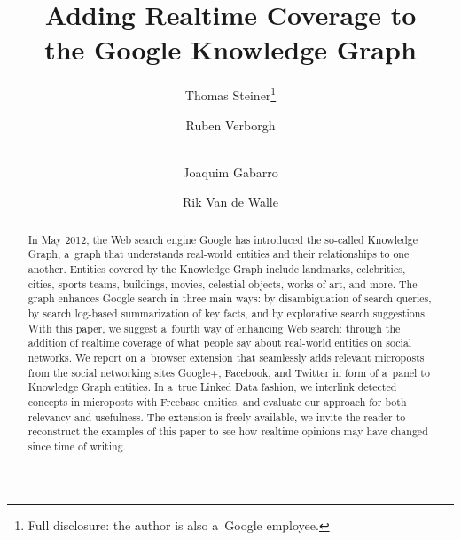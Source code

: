 \documentclass[runningheads,a4paper]{llncs}
\begin{document}
\title{Adding Realtime Coverage to\\the Google Knowledge Graph}

\author{Thomas Steiner\thanks{Full disclosure: the author is also a~Google employee.} \and
		Ruben Verborgh \and \\
		Joaquim Gabarro \and 
		Rik Van de Walle		
}


\maketitle
\setcounter{footnote}{0}

\begin{abstract}
In May 2012, the Web search engine Google has introduced the so-called Knowledge Graph,
a~graph that understands real-world entities and their relationships to one another.
Entities covered by the Knowledge Graph include landmarks, celebrities, cities, sports
teams, buildings, movies, celestial objects, works of art, and more.
The graph enhances Google search in three main ways:
by disambiguation of search queries,
by search log-based summarization of key facts,
and by explorative search suggestions.
With this paper, we suggest a~fourth way of enhancing Web search:
through the addition of realtime coverage
of what people say about real-world entities on social networks.
We report on a~browser extension that seamlessly adds relevant microposts
from the social networking sites Google+, Facebook, and Twitter
in form of a~panel to Knowledge Graph entities.
In a~true Linked Data fashion, we interlink detected concepts in microposts
with Freebase entities, and evaluate our approach for both relevancy and usefulness.
The extension is freely available,
we invite the reader to reconstruct the examples of this paper
to see how realtime opinions may have changed since time of writing.
\end{abstract}
\end{document}
